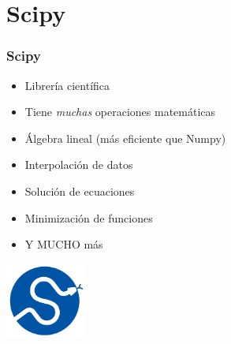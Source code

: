 \documentclass[14pt,aspectratio=169,xcolor=dvipsnames]{beamer}
\begin{document}
\begin{frame}\frametitle{}
\end{frame}
\section{Scipy}
\begin{frame}\frametitle{Scipy}
    \begin{itemize}
        \item Librería científica
        \item Tiene \emph{muchas} operaciones matemáticas
        \item Álgebra lineal (más eficiente que Numpy)
        \item {\only<2>{\bf}Interpolación de datos}
        \item {Solución de ecuaciones}
        \item {Minimización de funciones}
        \item Y MUCHO más
    \end{itemize}

    \begin{flushright}
        \includegraphics[width=0.2\textwidth]{../images/logos/scipy.png}
    \end{flushright}
\end{frame}
\end{document}
